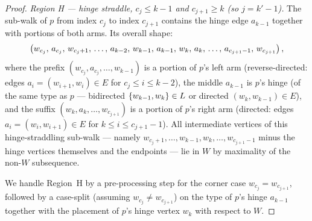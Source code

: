 \documentclass[main]{subfiles}
\begin{document}
\begin{proof}
\emph{Region H --- hinge straddle, $c_j \le k - 1$ and $c_{j+1} \ge k$ (so $j = k' - 1$).}
The sub-walk of $p$ from index $c_j$ to index $c_{j+1}$ contains the hinge edge $a_{k-1}$ together with portions of both arms. Its overall shape:
\[
    \left ( w_{c_j},\, a_{c_j},\, w_{c_j + 1},\, \dots,\, a_{k-2},\, w_{k-1},\, a_{k-1},\, w_k,\, a_k,\, \dots,\, a_{c_{j+1} - 1},\, w_{c_{j+1}} \right ),
\]
where the prefix $(w_{c_j}, a_{c_j}, \dots, w_{k-1})$ is a portion of $p$'s left arm (reverse-directed: edges $a_i = (w_{i+1}, w_i) \in E$ for $c_j \le i \le k-2$), the middle $a_{k-1}$ is $p$'s hinge (of the same type as $p$ --- bidirected $\left \{ w_{k-1}, w_k \right \} \in L$ or directed $(w_k, w_{k-1}) \in E$), and the suffix $(w_k, a_k, \dots, w_{c_{j+1}})$ is a portion of $p$'s right arm (directed: edges $a_i = (w_i, w_{i+1}) \in E$ for $k \le i \le c_{j+1} - 1$). All intermediate vertices of this hinge-straddling sub-walk --- namely $w_{c_j + 1}, \dots, w_{k-1}, w_k, \dots, w_{c_{j+1} - 1}$ minus the hinge vertices themselves and the endpoints --- lie in $W$ by maximality of the non-$W$ subsequence.


We handle Region~H by a pre-processing step for the corner case
$w_{c_j} = w_{c_{j+1}}$, followed by a case-split (assuming
$w_{c_j} \ne w_{c_{j+1}}$) on the type of $p$'s hinge $a_{k - 1}$ together
with the placement of $p$'s hinge vertex $w_k$ with respect to $W$.


\end{proof}
\end{document}
